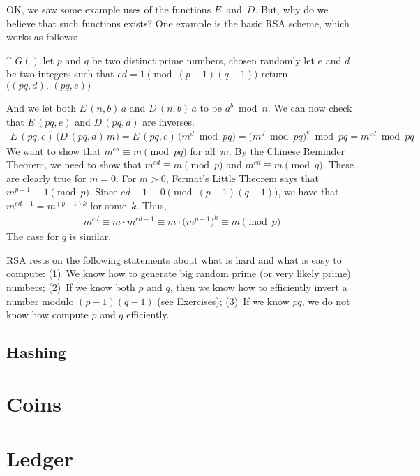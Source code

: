 OK, we saw some example uses of the functions $E$~and~$D$.
But, why do we believe that such functions exists?
One example is the basic RSA scheme, which works as follows:
\medskip
\begin{alg}
\^  $G()$
\0  let $p$ and $q$ be two distinct prime numbers, chosen randomly
\0  let $e$ and $d$ be two integers such that $ed = 1 \pmod{(p-1)(q-1)}$
\0  return $\bigl((pq,d),\, (pq,e)\bigr)$
\end{alg}
\medskip
\noindent
And we let both $E\,(n,b)\,a$ and $D\,(n,b)\,a$ to be $a^b \bmod n$.
We can now check that $E\,(pq,e)$ and $D\,(pq,d)$ are inverses.
\begin{align*}
E\,(pq,e)\,\bigl(D\,(pq,d)\,m\bigr)
  = E\,(pq,e)\,\bigl(m^d \bmod pq\bigr)
  = \bigl(m^d \bmod pq\bigr)^e \bmod pq
  = m^{ed} \bmod pq
\end{align*}
We want to show that $m^{ed}\equiv m \pmod{pq}$ for all~$m$.
By the Chinese Reminder Theorem, we need to show that $m^{ed} \equiv m \pmod{p}$ and $m^{ed} \equiv m \pmod{q}$.
These are clearly true for $m=0$.
For $m>0$, Fermat's Little Theorem says that $m^{p-1} \equiv 1 \pmod{p}$.
Since $ed-1 \equiv 0 \pmod{(p-1)(q-1)}$, we have that $m^{ed-1}=m^{(p-1)k}$ for some~$k$.
Thus,
\begin{align*}
m^{ed} \equiv m \cdot m^{ed-1} \equiv m \cdot \bigl(m^{p-1}\bigr)^k \equiv m
  \pmod{p}
\end{align*}
The case for $q$ is similar.

RSA rests on the following statements about what is hard and what is easy to compute:
(1)~We know how to generate big random prime (or very likely prime) numbers;
(2)~If we know both $p$ and $q$, then we know how to efficiently invert a number modulo $(p-1)(q-1)$ (see Exercises);
(3)~If we know $pq$, we do not know how compute $p$ and $q$ efficiently.

\subsection{Hashing}

\section{Coins}\label{sec:bitcoin-coin}

\section{Ledger}\label{sec:bitcoin-ledger}

